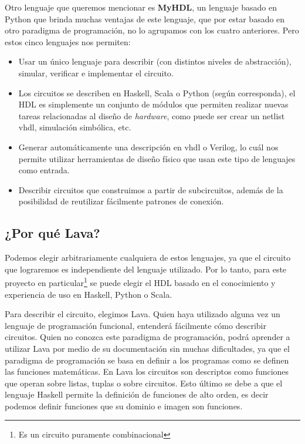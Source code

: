 Otro lenguaje que queremos mencionar es \textbf{MyHDL}\cite{MyHDL}, un lenguaje basado en Python que brinda muchas ventajas de este lenguaje, que por estar basado en otro paradigma de programación, no lo agrupamos con los cuatro anteriores. Pero estos cinco lenguajes nos permiten:

\begin{itemize}
\item Usar un único lenguaje para describir (con distintos niveles de abstracción), simular, verificar e implementar el circuito.
\item Los circuitos se describen en Haskell, Scala o Python (según corresponda), el HDL es simplemente un conjunto de módulos que permiten realizar nuevas tareas relacionadas al diseño de \emph{hardware}, como puede ser crear un netlist \gls{vhdl}, simulación simbólica, etc. 
\item Generar automáticamente una descripción en \gls{vhdl} o Verilog, lo cuál nos permite utilizar herramientas de diseño físico que usan este tipo de lenguajes como entrada.
\item Describir circuitos que construimos a partir de subcircuitos, además de la posibilidad de reutilizar fácilmente patrones de conexión.
\end{itemize}

\subsection{¿Por qué Lava?}
Podemos elegir arbitrariamente cualquiera de estos lenguajes, ya que el circuito que lograremos es independiente del lenguaje utilizado. Por lo tanto, para este proyecto en particular\footnote{Es un circuito puramente combinacional} se puede elegir el HDL basado en el conocimiento y experiencia de uso en Haskell, Python o Scala.

Para describir el circuito, elegimos Lava. Quien haya utilizado alguna vez un lenguaje de programación funcional, entenderá fácilmente cómo describir circuitos. Quien no conozca este paradigma de programación, podrá aprender a utilizar Lava por medio de su documentación\cite{Lava-tutorial} sin muchas dificultades, ya que el paradigma de programación se basa en definir a los programas como se definen las funciones matemáticas. En Lava los circuitos son descriptos como funciones que operan sobre listas, tuplas o sobre circuitos. Esto último se debe a que el lenguaje Haskell permite la definición de funciones de alto orden, es decir podemos definir funciones que su dominio e imagen son funciones. 

